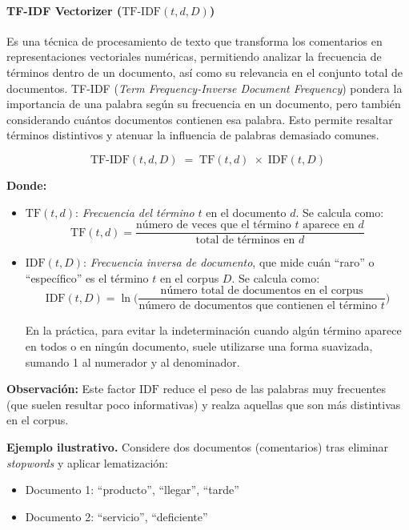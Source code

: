\documentclass{matematicasud}
\begin{document}
\paragraph{TF-IDF Vectorizer (\(\text{TF-IDF}(t,d,D)\))}
Es una técnica de procesamiento de texto que transforma los comentarios en representaciones vectoriales numéricas, permitiendo analizar la frecuencia de términos dentro de un documento, así como su relevancia en el conjunto total de documentos. TF-IDF (\textit{Term Frequency-Inverse Document Frequency}) pondera la importancia de una palabra según su frecuencia en un documento, pero también considerando cuántos documentos contienen esa palabra. Esto permite resaltar términos distintivos y atenuar la influencia de palabras demasiado comunes.

\[
\text{TF-IDF}(t, d, D) \;=\; \text{TF}(t, d) \;\times\; \text{IDF}(t, D)
\]

\noindent\textbf{Donde:}
\begin{itemize}
    \item \(\text{TF}(t,d)\): \textit{Frecuencia del término} \(t\) en el documento \(d\). Se calcula como:
    \[
    \text{TF}(t,d) = \frac{\text{número de veces que el término } t \text{ aparece en } d}{\text{total de términos en } d}
    \]
    \item \(\text{IDF}(t,D)\): \textit{Frecuencia inversa de documento}, que mide cuán ``raro'' o ``específico'' es el término \(t\) en el corpus \(D\). Se calcula como:
    \[
    \text{IDF}(t,D) = \ln\!\Biggl(\frac{\text{número total de documentos en el corpus}}{\text{número de documentos que contienen el término } t}\Biggr)
    \]
    
    En la práctica, para evitar la indeterminación cuando algún término aparece en todos o en ningún documento, suele utilizarse una forma suavizada, sumando 1 al numerador y al denominador.
    
\end{itemize}

\noindent\textbf{Observación:} Este factor \(\text{IDF}\) reduce el peso de las palabras muy frecuentes (que suelen resultar poco informativas) y realza aquellas que son más distintivas en el corpus.

\vspace{0.5em}
\noindent
\textbf{Ejemplo ilustrativo.} Considere dos documentos (comentarios) tras eliminar \textit{stopwords} y aplicar lematización:
\begin{itemize}
    \item Documento 1: ``producto'', ``llegar'', ``tarde''
    \item Documento 2: ``servicio'', ``deficiente''
\end{itemize}
\end{document}
